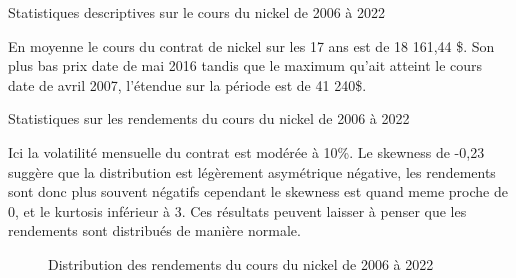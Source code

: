 \begin{table}[H]
    \centering
    \caption{Statistiques descriptives sur le cours du nickel de 2006 à 2022}
    \sffamily
    \resizebox{\textwidth}{!}{}
\end{table}
En moyenne le cours du contrat de nickel sur les 17 ans est de 18 161,44 \$. Son plus bas prix date de mai 2016 tandis que le maximum qu'ait atteint le cours date de 
avril 2007, l'étendue sur la période est de 41 240\$.
\begin{table}[H]
    \centering
    \caption{Statistiques sur les rendements du cours du nickel de 2006 à 2022}
    \sffamily
    \resizebox{\textwidth}{!}{}
\end{table}
Ici la volatilité mensuelle du contrat est modérée à 10\%. Le skewness de -0,23 suggère que la distribution est légèrement asymétrique négative, les rendements sont donc plus souvent négatifs cependant le skewness est quand meme proche de 0, et le kurtosis inférieur à 3. Ces résultats peuvent laisser à penser que les rendements sont 
distribués de manière normale.
\begin{figure}[H]
    \centering
    \resizebox{\textwidth}{!}{}
    \caption{Distribution des rendements du cours du nickel de 2006 à 2022}
\end{figure}
